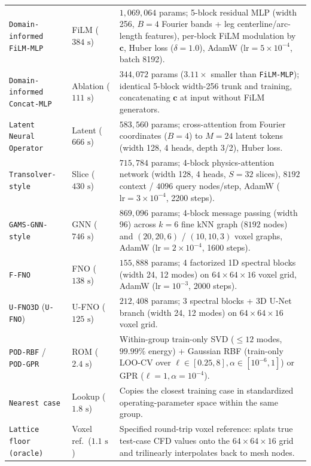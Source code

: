 \documentclass[11pt]{article}
\begin{document}
\begin{table}[!htbp]
{\begin{tabular}{p{3.4cm}p{2.3cm}p{10.4cm}}
\texttt{Domain-informed FiLM-MLP} & FiLM ($384\text{ s}$) & $1,069,064$ params; 5-block residual MLP (width 256, $B=4$ Fourier bands + leg centerline/arc-length features), per-block FiLM modulation by $\mathbf{c}$, Huber loss ($\delta=1.0$), AdamW ($\text{lr}=5\times 10^{-4}$, batch 8192). \\
\texttt{Domain-informed Concat-MLP} & Ablation ($111\text{ s}$) & $344,072$ params ($3.11\times$ smaller than \texttt{FiLM-MLP}); identical 5-block width-256 trunk and training, concatenating $\mathbf{c}$ at input without FiLM generators. \\
\texttt{Latent Neural Operator} & Latent ($666\text{ s}$) & $583,560$ params; cross-attention from Fourier coordinates ($B=4$) to $M=24$ latent tokens (width 128, 4 heads, depth 3/2), Huber loss. \\
\texttt{Transolver-style} & Slice ($430\text{ s}$) & $715,784$ params; 4-block physics-attention network (width 128, 4 heads, $S=32$ slices), $8192$ context / $4096$ query nodes/step, AdamW ($\text{lr}=3\times 10^{-4}$, 2200 steps). \\
\texttt{GAMS-GNN-style} & GNN ($746\text{ s}$) & $869,096$ params; 4-block message passing (width 96) across $k=6$ fine kNN graph ($8192$ nodes) and $(20,20,6)$ / $(10,10,3)$ voxel graphs, AdamW ($\text{lr}=2\times 10^{-4}$, 1600 steps). \\
\texttt{F-FNO} & FNO ($138\text{ s}$) & $155,888$ params; 4 factorized 1D spectral blocks (width 24, 12 modes) on $64\times 64\times 16$ voxel grid, AdamW ($\text{lr}=10^{-3}$, 2000 steps). \\
\texttt{U-FNO3D} (\texttt{U-FNO}) & U-FNO ($125\text{ s}$) & $212,408$ params; 3 spectral blocks + 3D U-Net branch (width 24, 12 modes) on $64\times 64\times 16$ voxel grid. \\
\texttt{POD-RBF} / \texttt{POD-GPR} & ROM ($2.4\text{ s}$) & Within-group train-only SVD ($\le 12$ modes, $99.99\%$ energy) + Gaussian RBF (train-only LOO-CV over $\ell \in [0.25,8], \alpha \in [10^{-6},1]$) or GPR ($\ell=1, \alpha=10^{-4}$). \\
\texttt{Nearest case} & Lookup ($1.8\text{ s}$) & Copies the closest training case in standardized operating-parameter space within the same group. \\
\texttt{Lattice floor (oracle)} & Voxel ref.\ ($1.1\text{ s}$) & Specified round-trip voxel reference: splats true test-case CFD values onto the $64\times 64\times 16$ grid and trilinearly interpolates back to mesh nodes. \\
\bottomrule
\end{tabular}%
}
\end{table}
\end{document}
